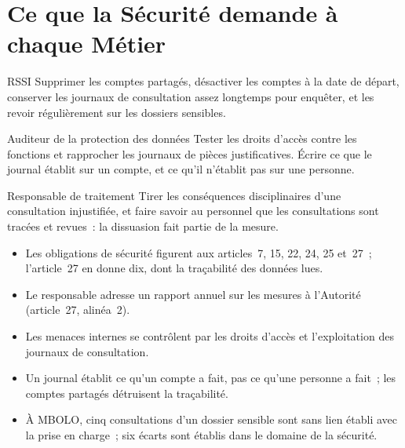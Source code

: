 \section{Ce que la Sécurité demande à chaque Métier}
\label{sec:c07-metiers}

\begin{boxmetier}{RSSI}
Supprimer les comptes partagés, désactiver les comptes à la date de départ,
conserver les journaux de consultation assez longtemps pour enquêter, et
les revoir régulièrement sur les dossiers sensibles.
\end{boxmetier}

\begin{boxmetier}{Auditeur de la protection des données}
Tester les droits d'accès contre les fonctions et rapprocher les journaux de
pièces justificatives. Écrire ce que le journal établit sur un compte, et ce
qu'il n'établit pas sur une personne.
\end{boxmetier}

\begin{boxmetier}{Responsable de traitement}
Tirer les conséquences disciplinaires d'une consultation injustifiée, et
faire savoir au personnel que les consultations sont tracées et revues~:
la dissuasion fait partie de la mesure.
\end{boxmetier}

\begin{boxresume}
\begin{itemize}
    \item Les obligations de sécurité figurent aux articles~7, 15, 22, 24,
          25 et~27~; l'article~27 en donne dix, dont la traçabilité des
          données lues.
    \item Le responsable adresse un rapport annuel sur les mesures à
          l'Autorité (article~27, alinéa~2).
    \item Les menaces internes se contrôlent par les droits d'accès et
          l'exploitation des journaux de consultation.
    \item Un journal établit ce qu'un compte a fait, pas ce qu'une personne a
          fait~; les comptes partagés détruisent la traçabilité.
    \item À MBOLO, cinq consultations d'un dossier sensible sont sans lien
          établi avec la prise en charge~; six écarts sont établis dans le
          domaine de la sécurité.
\end{itemize}
\end{boxresume}

